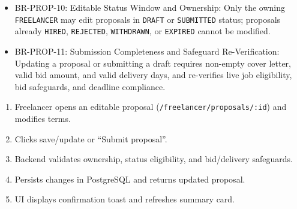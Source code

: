\begin{itemize}[leftmargin=1.6em,topsep=3pt,itemsep=2pt,parsep=0pt,label=$\bullet$]\brrulelist
    \item BR-PROP-10: Editable Status Window and Ownership: Only the owning \texttt{FREELANCER} may edit proposals in \texttt{DRAFT} or \texttt{SUBMITTED} status; proposals already \texttt{HIRED}, \texttt{REJECTED}, \texttt{WITHDRAWN}, or \texttt{EXPIRED} cannot be modified.
    \item BR-PROP-11: Submission Completeness and Safeguard Re-Verification: Updating a proposal or submitting a draft requires non-empty cover letter, valid bid amount, and valid delivery days, and re-verifies live job eligibility, bid safeguards, and deadline compliance.
\end{itemize}

\begin{enumerate}[leftmargin=1.8em,topsep=3pt,itemsep=2pt,parsep=0pt]
    \item Freelancer opens an editable proposal (\texttt{/freelancer/proposals/:id}) and modifies terms.
    \item Clicks save/update or ``Submit proposal''.
    \item Backend validates ownership, status eligibility, and bid/delivery safeguards.
    \item Persists changes in PostgreSQL and returns updated proposal.
    \item UI displays confirmation toast and refreshes summary card.
\end{enumerate}

